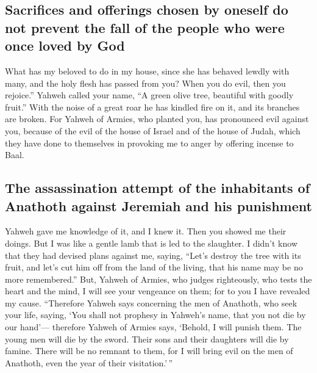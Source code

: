 \hypertarget{sacrifices-and-offerings-chosen-by-oneself-do-not-prevent-the-fall-of-the-people-who-were-once-loved-by-god}{%
\subsection{Sacrifices and offerings chosen by oneself do not prevent
the fall of the people who were once loved by
God}\label{sacrifices-and-offerings-chosen-by-oneself-do-not-prevent-the-fall-of-the-people-who-were-once-loved-by-god}}

 What has my beloved to do in my house, since she has
behaved lewdly with many, and the holy flesh has passed from you? When
you do evil, then you rejoice.''  Yahweh called your
name, ``A green olive tree, beautiful with goodly fruit.'' With the
noise of a great roar he has kindled fire on it, and its branches are
broken.  For Yahweh of Armies, who planted you, has
pronounced evil against you, because of the evil of the house of Israel
and of the house of Judah, which they have done to themselves in
provoking me to anger by offering incense to Baal.

\hypertarget{the-assassination-attempt-of-the-inhabitants-of-anathoth-against-jeremiah-and-his-punishment}{%
\subsection{The assassination attempt of the inhabitants of Anathoth
against Jeremiah and his
punishment}\label{the-assassination-attempt-of-the-inhabitants-of-anathoth-against-jeremiah-and-his-punishment}}

 Yahweh gave me knowledge of it, and I knew it. Then you
showed me their doings.  But I was like a gentle lamb
that is led to the slaughter. I didn't know that they had devised plans
against me, saying, ``Let's destroy the tree with its fruit, and let's
cut him off from the land of the living, that his name may be no more
remembered.''  But, Yahweh of Armies, who judges
righteously, who tests the heart and the mind, I will see your vengeance
on them; for to you I have revealed my cause. 
``Therefore Yahweh says concerning the men of Anathoth, who seek your
life, saying, `You shall not prophesy in Yahweh's name, that you not die
by our hand'---  therefore Yahweh of Armies says,
`Behold, I will punish them. The young men will die by the sword. Their
sons and their daughters will die by famine.  There will
be no remnant to them, for I will bring evil on the men of Anathoth,
even the year of their visitation.'\,''

